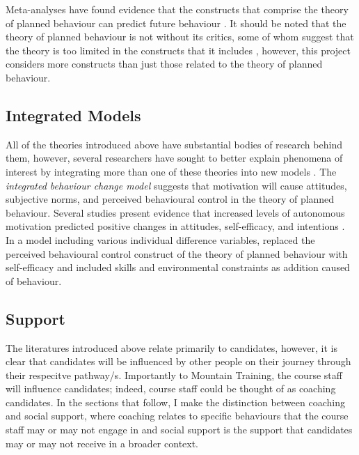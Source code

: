 \documentclass[
  12pt,
  a4paper,
]{book}
\begin{document}
Meta-analyses have found evidence that the constructs that comprise the theory of planned behaviour can predict future behaviour \citep{Armitage2001, Hagger2002}. It should be noted that the theory of planned behaviour is not without its critics, some of whom suggest that the theory is too limited in the constructs that it includes \citep[cf.~][]{Sniehotta2014}, however, this project considers more constructs than just those related to the theory of planned behaviour.

\hypertarget{integrated-models}{%
\subsection{Integrated Models}\label{integrated-models}}

All of the theories introduced above have substantial bodies of research behind them, however, several researchers have sought to better explain phenomena of interest by integrating more than one of these theories into new models \citep[e.g.,][]{Fishbein2000, Hagger2009, Hagger2014, Hamilton2017}. The \emph{integrated behaviour change model} \citep{Hagger2009, Hagger2014, Hamilton2017} suggests that motivation will cause attitudes, subjective norms, and perceived behavioural control in the theory of planned behaviour. Several studies present evidence that increased levels of autonomous motivation predicted positive changes in attitudes, self-efficacy, and intentions \citep[e.g.,][]{Hagger2009, Jacobs2011}. In a model including various individual difference variables, \citet{Fishbein2000} replaced the perceived behavioural control construct of the theory of planned behaviour with self-efficacy \citep[n.b.,][ suggested that perceived behavioural control is similar to the construct of self-efficacy]{Ajzen1991} and included skills and environmental constraints as addition caused of behaviour.

\hypertarget{support}{%
\subsection{Support}\label{support}}

The literatures introduced above relate primarily to candidates, however, it is clear that candidates will be influenced by other people on their journey through their respecitve pathway/s. Importantly to Mountain Training, the course staff will influence candidates; indeed, course staff could be thought of as coaching candidates. In the sections that follow, I make the distinction between coaching and social support, where coaching relates to specific behaviours that the course staff may or may not engage in and social support is the support that candidates may or may not receive in a broader context.
\end{document}
